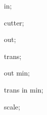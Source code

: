 {
  

  \attribute in;

  \attribute cutter;
  
  \attribute out;
  
  \attribute trans;

  \attribute out min;

  \attribute trans in min;

  \attribute scale;

}
